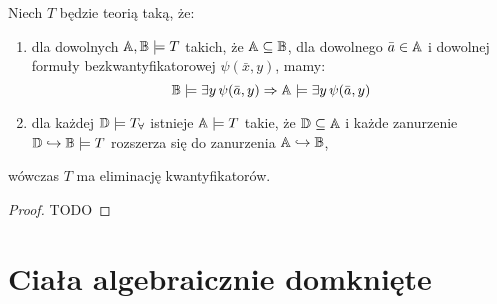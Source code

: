 \documentclass{article}
\begin{document}
\begin{tw}
	\label{tw:qe}
	Niech $T$ będzie teorią taką, że:
	\begin{enumerate}
		\item dla dowolnych $\mathbb{A}, \mathbb{B} \models T$ takich, że $\mathbb{A} \subseteq \mathbb{B}$, dla dowolnego $\bar{a} \in \mathbb{A}$ i dowolnej formuły bezkwantyfikatorowej $\psi(\bar{x}, y)$, mamy:
			\[
				\mathbb{B} \models \exists y \, \psi(\bar{a}, y) \Rightarrow \mathbb{A} \models \exists y \, \psi(\bar{a}, y)
			\]
		\item dla każdej $\mathbb{D} \models T_{\forall}$ istnieje $\mathbb{A} \models T$ takie, że $\mathbb{D} \subseteq \mathbb{A}$ i każde zanurzenie $\mathbb{D} \hookrightarrow \mathbb{B} \models T$ rozszerza się do zanurzenia $\mathbb{A} \hookrightarrow \mathbb{B}$,
	\end{enumerate}
	wówczas $T$ ma eliminację kwantyfikatorów.
\end{tw}
\begin{proof}
	\color{red} TODO
\end{proof}



\section{Ciała algebraicznie domknięte}

\end{document}
